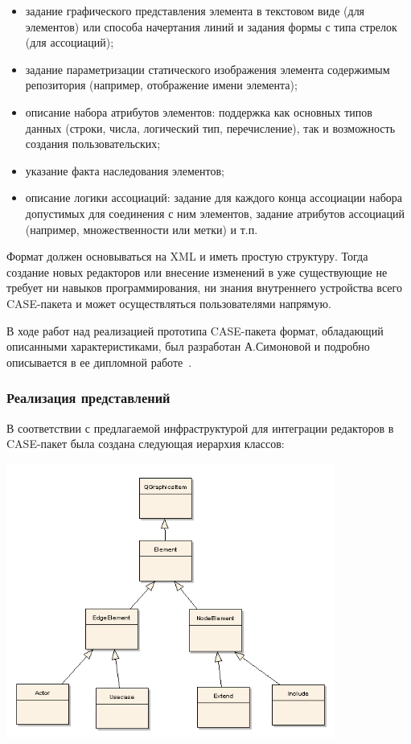 \documentclass[a5paper]{article}
\begin{document}
\begin{itemize}
  \item задание графического представления элемента в текстовом виде (для
        элементов) или способа начертания линий и задания формы с типа стрелок
        (для ассоциаций);
  \item задание параметризации статического изображения элемента содержимым
        репозитория (например, отображение имени элемента);
  \item описание набора атрибутов элементов: поддержка как основных типов данных
        (строки, числа, логический тип, перечисление), так и возможность
        создания пользовательских;
  \item указание факта наследования элементов;
  \item описание логики ассоциаций: задание для каждого конца ассоциации набора
        допустимых для соединения с ним элементов, задание атрибутов ассоциаций
        (например, множественности или метки) и т.п.
\end{itemize}

Формат должен основываться на XML и иметь
простую структуру. Тогда создание новых редакторов или внесение
изменений в уже существующие не требует ни навыков программирования, ни
знания внутреннего устройства всего CASE-пакета и может осуществляться
пользователями напрямую.

В ходе работ над реализацией прототипа CASE-пакета формат, обладающий описанными
характеристиками, был разработан А.Симоновой и подробно описывается в
ее дипломной работе~\cite{simonova}.

\subsubsection{Реализация представлений}

В соответствии с предлагаемой инфраструктурой для интеграции редакторов
в CASE-пакет была создана следующая иерархия классов:

{\centering 
\includegraphics[width=10.786cm,height=9.038cm]{draft04-img2.png} \par}
\end{document}
